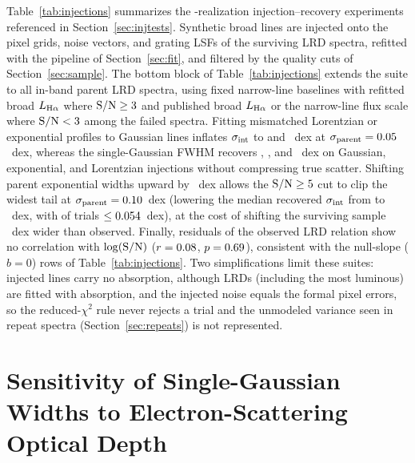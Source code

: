\documentclass[twocolumn,linenumbers]{aastex701}
\newcommand{\sigint}{\sigma_{\rm int}}
\newcommand{\LHa}{L_{\rm H\alpha}}
\begin{document}
Table~\ref{tab:injections} summarizes the \NReal{}-realization injection--recovery experiments referenced in Section~\ref{sec:injtests}.
Synthetic broad lines are injected onto the pixel grids, noise vectors, and grating LSFs of the \NLRD{} surviving LRD spectra, refitted with the pipeline of Section~\ref{sec:fit}, and filtered by the quality cuts of Section~\ref{sec:sample}.
The bottom block of Table~\ref{tab:injections} extends the suite to all \NParentInBand{} in-band parent LRD spectra, using fixed narrow-line baselines with refitted broad $\LHa$ where ${\rm S/N}\geq3{}$ and published broad $\LHa$ or the narrow-line flux scale where ${\rm S/N}<3{}$ among the \NParentFail{} failed spectra.
Fitting mismatched Lorentzian or exponential profiles to Gaussian lines inflates $\sigint$ to \recGL{} and \recGE{}~dex at $\sigma_{\rm parent}=0.05{}$~dex, whereas the single-Gaussian FWHM recovers \recGG{}, \recEG{}, and \recLG{}~dex on Gaussian, exponential, and Lorentzian injections without compressing true scatter.
Shifting parent exponential widths upward by \wideInjShift{}~dex allows the ${\rm S/N}\geq5{}$ cut to clip the widest tail at $\sigma_{\rm parent}=0.10{}$~dex (lowering the median recovered $\sigint$ from \recTenE{} to \recTenWide{}~dex, with \hitTenWide{} of \NReal{} trials $\leq0.054{}$~dex), at the cost of shifting the surviving sample \wideSurvShift{}~dex wider than observed.
Finally, residuals of the observed LRD relation show no correlation with $\log({\rm S/N})$ ($r=0.08{}$, $p=0.69{}$), consistent with the null-slope ($b=0$) rows of Table~\ref{tab:injections}.
Two simplifications limit these suites: injected lines carry no absorption, although \NAbsLRD{} LRDs (including the \NBright{} most luminous) are fitted with absorption, and the injected noise equals the formal pixel errors, so the reduced-$\chi^2$ rule never rejects a trial and the unmodeled variance seen in repeat spectra (Section~\ref{sec:repeats}) is not represented.



\section{Sensitivity of Single-Gaussian Widths to Electron-Scattering Optical Depth} \label{app:scattering}
\end{document}
